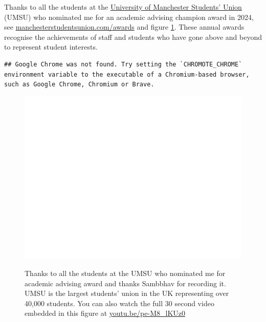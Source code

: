 \documentclass[
  12pt,
]{book}
\begin{document}
Thanks to all the students at the \href{https://en.wikipedia.org/wiki/University_of_Manchester_Students\%27_Union}{University of Manchester Students' Union} (UMSU) who nominated me for an academic advising champion award in 2024, see \href{https://manchesterstudentsunion.com/awards}{manchesterstudentsunion.com/awards} and figure \ref{fig:su-fig}. These annual awards recognise the achievements of staff and students who have gone above and beyond to represent student interests. \citep{su2024}

\begin{verbatim}
## Google Chrome was not found. Try setting the `CHROMOTE_CHROME` environment variable to the executable of a Chromium-based browser, such as Google Chrome, Chromium or Brave.
\end{verbatim}

\begin{figure}

{\centering \href{https://www.youtube.com/embed/pe-M8_lKUz0}{\includegraphics[width=0.99\linewidth]{duncan-hull_files/figure-latex/su-fig-1} }

}

\caption{Thanks to all the students at the UMSU who nominated me for academic advising award and thanks Sambbhav for recording it. UMSU is the largest students' union in the UK representing over 40,000 students. You can also watch the full 30 second video embedded in this figure at \href{https://youtu.be/pe-M8_lKUz0}{youtu.be/pe-M8\_lKUz0} \citep{youtube-su2024}}\label{fig:su-fig}
\end{figure}
\end{document}

